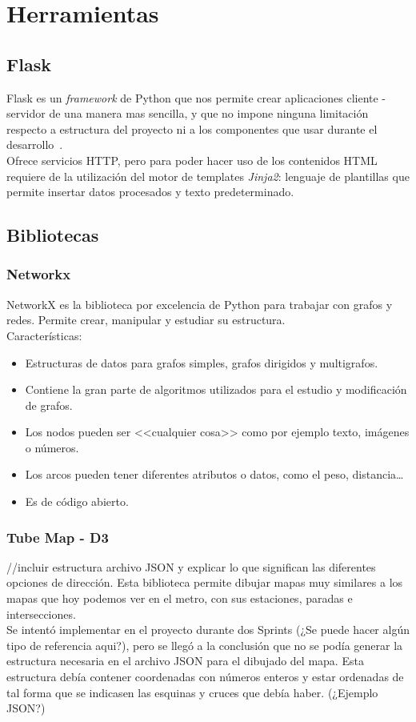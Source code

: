 \section{Herramientas}
\subsection{Flask}
Flask es un \textit{framework} de Python que nos permite crear aplicaciones cliente - servidor de una manera mas sencilla, y que no impone ninguna limitación respecto a estructura del proyecto ni a los componentes que usar durante el desarrollo~\cite{grinberg2014flask}.
\\
Ofrece servicios HTTP, pero para poder hacer uso de los contenidos HTML requiere de la utilización del motor de templates \textit{Jinja2}: lenguaje de plantillas que permite insertar datos procesados y texto predeterminado.

\subsection{Bibliotecas}

\subsubsection{Networkx}
NetworkX es la biblioteca por excelencia de Python para trabajar con grafos y redes. Permite crear, manipular y estudiar su estructura.
\\
Características:
\begin{itemize}
	\item Estructuras de datos para grafos simples, grafos dirigidos y multigrafos.
	\item Contiene la gran parte de algoritmos utilizados para el estudio y modificación de grafos.
	\item Los nodos pueden ser <<cualquier cosa>> como por ejemplo texto, imágenes o números.
	\item Los arcos pueden tener diferentes atributos o datos, como el peso, distancia\dots
	\item Es de código abierto.
\end{itemize}


\subsubsection{Tube Map - D3}
//incluir estructura archivo JSON y explicar lo que significan las diferentes opciones de dirección.
Esta biblioteca permite dibujar mapas muy similares a los mapas que hoy podemos ver en el metro, con sus estaciones, paradas e intersecciones.
\\
Se intentó implementar en el proyecto durante dos Sprints (¿Se puede hacer algún tipo de referencia aqui?), pero se llegó a la conclusión que no se podía generar la estructura necesaria en el archivo JSON para el dibujado del mapa. Esta estructura debía contener coordenadas con números enteros y estar ordenadas de tal forma que se indicasen las esquinas y cruces que debía haber.
(¿Ejemplo JSON?)

